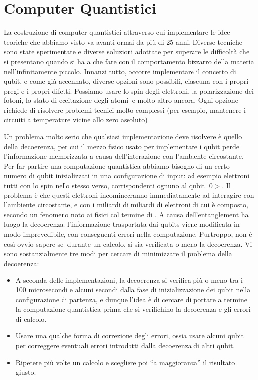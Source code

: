 \section{Computer Quantistici}

La costruzione di computer quantistici attraverso cui implementare le
idee teoriche che abbiamo visto va avanti ormai da più di 25 anni. Diverse tecniche sono state sperimentate e diverse soluzioni adottate
per superare le difficoltà che si presentano quando si ha a che fare con
il comportamento bizzarro della materia nell’infinitamente piccolo. 
Innanzi tutto, occorre implementare il concetto di qubit, e come già
accennato, diverse opzioni sono possibili, ciascuna con i propri pregi
e i propri difetti. Possiamo usare lo spin degli elettroni, la polarizzazione dei fotoni, lo
stato di eccitazione degli atomi, e molto altro ancora. Ogni opzione
richiede di risolvere problemi tecnici molto complessi (per esempio,
mantenere i circuiti a temperature vicine allo zero assoluto)

Un problema molto serio che qualsiasi implementazione deve
risolvere è quello della decoerenza, per cui il mezzo fisico usato per
implementare i qubit perde l’informazione memorizzata a causa
dell’interazione con l’ambiente circostante.
Per far partire una computazione quantistica abbiamo bisogno di un
certo numero di qubit inizializzati in una configurazione di input:
ad esempio elettroni tutti con lo spin nello stesso verso, corrispondenti
ognuno al qubit $|0>$. Il problema è che questi elettroni incominceranno immediatamente
ad interagire con l’ambiente circostante, e con i miliardi di miliardi
di elettroni di cui è composto, secondo un fenomeno noto ai fisici col
termine di . A causa dell’entanglement ha luogo la decoerenza: l’informazione
trasportata dai qubits viene modificata in modo imprevedibile, con
conseguenti errori nella computazione. Purtroppo, non è così ovvio
sapere se, durante un calcolo, si sia verificata o meno la decoerenza. Vi sono sostanzialmente tre modi per cercare di minimizzare il
problema della decoerenza:

\begin{itemize}
  \item A seconda delle implementazioni, la decoerenza si verifica più o
meno tra i 100 microsecondi e alcuni secondi dalla fase di
inizializzazione dei qubit nella configurazione di partenza, e dunque
l’idea è di cercare di portare a termine la computazione quantistica
prima che si verifichino la decoerenza e gli errori di calcolo.
\item Usare una qualche forma di correzione degli errori, ossia usare alcuni
qubit per correggere eventuali errori introdotti dalla decoerenza di
altri qubit. 
\item Ripetere più volte un calcolo e scegliere poi “a maggioranza” il
risultato giusto.
\end{itemize}

